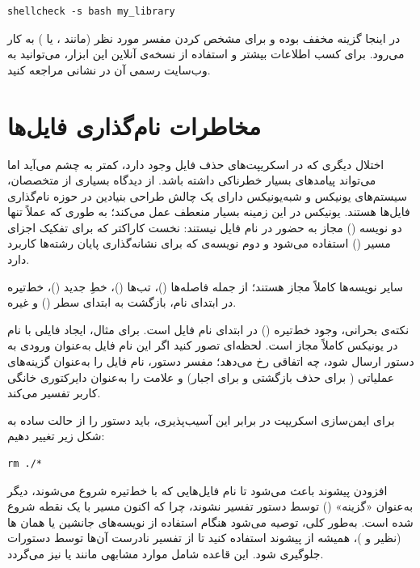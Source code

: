 \begin{latin}
\begin{lstlisting}
shellcheck -s bash my_library
\end{lstlisting}
\end{latin}

در اینجا گزینه  مخفف  بوده و برای مشخص کردن مفسر مورد نظر (مانند ،  یا ) به کار می‌رود. برای کسب اطلاعات بیشتر و استفاده از نسخه‌ی آنلاین این ابزار، می‌توانید به وب‌سایت رسمی آن در نشانی  مراجعه کنید.

\section{مخاطرات نام‌گذاری فایل‌ها}

اختلال دیگری که در اسکریپت‌های حذف فایل وجود دارد، کمتر به چشم می‌آید اما می‌تواند پیامدهای بسیار خطرناکی داشته باشد. از دیدگاه بسیاری از متخصصان، سیستم‌های یونیکس و شبه‌یونیکس دارای یک چالش طراحی بنیادین در حوزه نام‌گذاری فایل‌ها هستند. یونیکس در این زمینه بسیار منعطف عمل می‌کند؛ به طوری که عملاً تنها دو نویسه () مجاز به حضور در نام فایل نیستند: نخست کاراکتر \cmd{/} که برای تفکیک اجزای مسیر () استفاده می‌شود و دوم نویسه‌ی  که برای نشانه‌گذاری پایان رشته‌ها کاربرد دارد.

سایر نویسه‌ها کاملاً مجاز هستند؛ از جمله فاصله‌ها ()، تب‌ها ()، خطِ جدید ()، خط‌تیره در ابتدای نام، بازگشت به ابتدای سطر () و غیره.

نکته‌ی بحرانی، وجود خط‌تیره (\cmd{-}) در ابتدای نام فایل است. برای مثال، ایجاد فایلی با نام  در یونیکس کاملاً مجاز است. لحظه‌ای تصور کنید اگر این نام فایل به‌عنوان ورودی به دستور  ارسال شود، چه اتفاقی رخ می‌دهد؛ مفسر دستور، نام فایل را به‌عنوان گزینه‌های عملیاتی ( برای حذف بازگشتی و  برای اجبار) و علامت \cmd{\textasciitilde} را به‌عنوان دایرکتوری خانگی کاربر تفسیر می‌کند.

برای ایمن‌سازی اسکریپت در برابر این آسیب‌پذیری، باید دستور  را از حالت ساده به شکل زیر تغییر دهیم:

\begin{latin}
\begin{lstlisting}
rm ./*
\end{lstlisting}
\end{latin}

افزودن پیشوند  باعث می‌شود تا نام فایل‌هایی که با خط‌تیره شروع می‌شوند، دیگر به‌عنوان «گزینه» () توسط دستور تفسیر نشوند، چرا که اکنون مسیر با یک نقطه شروع شده است. به‌طور کلی، توصیه می‌شود هنگام استفاده از نویسه‌های جانشین یا همان ها (نظیر \cmd{*} و )، همیشه از پیشوند  استفاده کنید تا از تفسیر نادرست آن‌ها توسط دستورات جلوگیری شود. این قاعده شامل موارد مشابهی مانند  یا  نیز می‌گردد.

